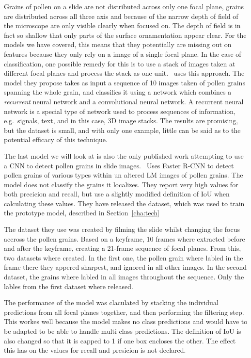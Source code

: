 Grains of pollen on a slide are not distributed across only one focal plane, grains are distributed across all three axis and because of the narrow depth of field of the microscope are only visible clearly when focused on.
The depth of field is in fact so shallow that only parts of the surface ornamentation appear clear.
For the models we have covered, this means that they potentially are missing out on features because they only rely on a image of a single focal plane.
In the case of classification, one possible remedy for this is to use a stack of images taken at different focal planes and process the stack as one unit.\ \cite{DaoodAndRibeiro_2018} uses this approach.
The model they propose takes as input a sequence of 10 images taken of pollen grains spanning the whole grain, and classifies it using a network which combines a \textit{recurrent} neural network and a convolutional neural network.
A recurrent neural network is a special type of network used to process sequences of information, e.g.\ signals, text, and in this case, 3D image stacks.
The results are promising, but the dataset is small, and with only one example, little can be said as to the potential efficacy of this technique.

The last model we will look at is also the only published work attempting to use a CNN to detect pollen grains in slide images.\ \cite{gallardo_caballero_precise_2019} Uses Faster R-CNN to detect pollen grains of various types within un altered LM images of pollen grains.
The model does not classify the grains it localizes.
They report very high values for both precicion and recall, but use a slightly modified definition of IoU when calculating these values.
They have released the dataset, which was used to train the prototype model, described in Section~\ref{cha:tech}

The dataset they use was created by filming the slide whilst changing the focus accross the pollen grains.
Based on a keyframe, 10 frames where extracted before and after the keyframe, creating a 21-frame sequence of focal planes.
From this, two datasets where created.
In the first one, the pollen grain where labled in the frame there they appered sharpest, and ignored in all other images.
In the second dataset, the grains where labled in all images throughout the sequence.
Only the lables from the first dataset where released.

The performance of the model was claculated by stacking the individual predictions from all focal planes together, and then performing the filtering step.
This workes well because the model makes no class predictions and would have to be adapted to be able to handle multi class predictions.
The definition of IoU is also changed so that it is capped to 1 if one box encloses the other.
The effect this has on the values for recall and presicion is not declared.

